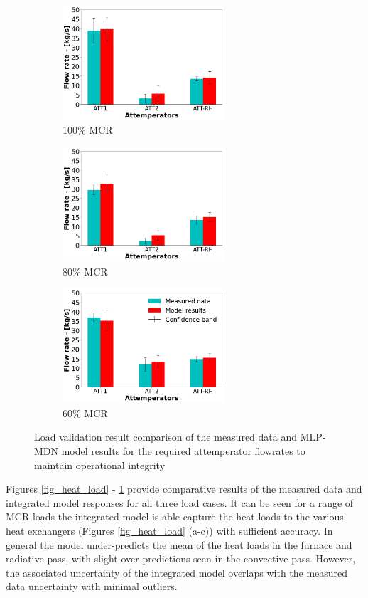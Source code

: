 \documentclass[a4paper,fleqn]{cas-sc}
\begin{document}
\begin{figure}
\centering
\begin{subfigure}{0.33\textwidth}
    \includegraphics[width=\linewidth, height = 4.25cm]{100_CASE_ATTEMP}
    \caption{100\% MCR}
\end{subfigure}\hfill %
\begin{subfigure}{0.33\textwidth}
    \includegraphics[width=\linewidth, height = 4.25cm]{80_CASE_ATTEMP}
    \caption{80\% MCR}
\end{subfigure}\hfill
\begin{subfigure}{0.33\textwidth}
    \includegraphics[width=\linewidth, height = 4.25cm]{60_CASE_ATTEMP}
    \caption{60\% MCR}
\end{subfigure}
\caption{Load validation result comparison of the measured data and MLP-MDN model results for the required attemperator flowrates to maintain operational integrity}
\label{fig_attemp}
\end{figure}

Figures \ref{fig_heat_load} - \ref{fig_attemp} provide comparative results of the measured data and integrated model responses for all three load cases. It can be seen for a range of MCR loads the integrated model is able capture the heat loads to the various heat exchangers (Figures \ref{fig_heat_load} (a-c)) with sufficient accuracy. In general the model under-predicts the mean of the heat loads in the furnace and radiative pass, with slight over-predictions seen in the convective pass. However, the associated uncertainty of the integrated model overlaps with the measured data uncertainty with minimal outliers.\\ 
\end{document}
